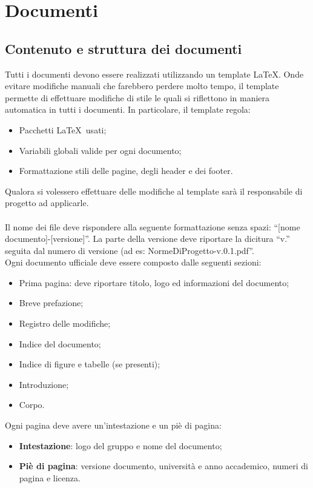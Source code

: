 \section{Documenti}{
	\label{sec:docs}
	\subsection{Contenuto e struttura dei documenti}{
		\label{sub:content}
		Tutti i documenti devono essere realizzati utilizzando un template \LaTeX. Onde evitare modifiche manuali che farebbero perdere molto tempo, il template permette di effettuare modifiche di stile le quali si riflettono in maniera automatica in tutti i documenti. In particolare, il template regola:
		\begin{itemize}
			\item Pacchetti \LaTeX\ usati;
			\item Variabili globali valide per ogni documento;
			\item Formattazione stili delle pagine, degli header e dei footer.
		\end{itemize}
		Qualora si volessero effettuare delle modifiche al template sar\`{a} il responsabile di progetto ad applicarle.\\
		\\
		Il nome dei file deve rispondere alla seguente formattazione senza spazi: “[nome documento]-[versione]”. La parte della versione deve riportare la dicitura “v.” seguita dal numero di versione (ad es: NormeDiProgetto-v.0.1.pdf”.\\
		Ogni documento ufficiale deve essere composto dalle seguenti sezioni:
		\begin{itemize}
			\item Prima pagina: deve riportare titolo, logo ed informazioni del documento;
			\item Breve prefazione;
			\item Registro delle modifiche;
			\item Indice del documento;
			\item Indice di figure e tabelle (se presenti);
			\item Introduzione;
			\item Corpo.
		\end{itemize}
		Ogni pagina deve avere un'intestazione e un pi\`{e} di pagina:
		\begin{itemize}
			\item \textbf{Intestazione}: logo del gruppo e nome del documento;
			\item \textbf{Pi\`{e} di pagina}: versione documento, universit\`{a} e anno accademico, numeri di pagina e licenza.

\end{itemize}}}
